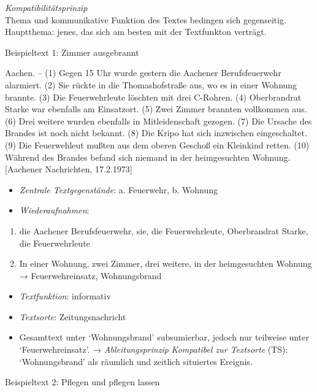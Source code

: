 \documentclass[
  letterpaper,
]{scrbook}
\providecommand{\tightlist}{%
  \setlength{\itemsep}{0pt}\setlength{\parskip}{0pt}}\usepackage{longtable,booktabs,array}
\begin{document}
\emph{Kompatibilitätsprinzip}\\
Thema und kommunikative Funktion des Textes bedingen sich gegenseitig.
Hauptthema: jenes, das sich am besten mit der Textfunkton verträgt.

Beispieltext 1: Zimmer ausgebrannt

Aachen. -- (1) Gegen 15 Uhr wurde gestern die Aachener Berufsfeuerwehr
alarmiert. (2) Sie rückte in die Thomashofstraße aus, wo es in einer
Wohnung brannte. (3) Die Feuerwehrleute löschten mit drei C-Rohren. (4)
Oberbrandrat Starke war ebenfalls am Einsatzort. (5) Zwei Zimmer
brannten vollkommen aus. (6) Drei weitere wurden ebenfalls in
Mitleidenschaft gezogen. (7) Die Ursache des Brandes ist noch nicht
bekannt. (8) Die Kripo hat sich inzwischen eingeschaltet. (9) Die
Feuerwehleut mußten aus dem oberen Geschoß ein Kleinkind retten. (10)
Während des Brandes befand sich niemand in der heimgesuchten Wohnung.\\
{[}Aachener Nachrichten, 17.2.1973{]}

\begin{itemize}
\tightlist
\item
  \emph{Zentrale Textgegenstände}: a. Feuerwehr, b. Wohnung\\
\item
  \emph{Wiederaufnahmen}:
\end{itemize}

\begin{enumerate}
\def\labelenumi{\alph{enumi}.}
\tightlist
\item
  die Aachener Berufsfeuerwehr, sie, die Feuerwehrleute, Oberbrandrat
  Starke, die Feuerwehrleute
\item
  In einer Wohnung, zwei Zimmer, drei weitere, in der heimgesuchten
  Wohnung → Feuerwehreinsatz, Wohnungsbrand\\
\end{enumerate}

\begin{itemize}
\tightlist
\item
  \emph{Textfunktion}: informativ
\item
  \emph{Textsorte}: Zeitungsnachricht
\item
  Gesamttext unter `Wohnungsbrand' subsumierbar, jedoch nur teilweise
  unter `Feuerwehreinsatz'. → \emph{Ableitungsprinzip} \emph{Kompatibel
  zur Textsorte} (TS): `Wohnungsbrand' als räumlich und zeitlich
  situiertes Ereignis.
\end{itemize}

Beispieltext 2: Pflegen und pflegen lassen\\
\end{document}
